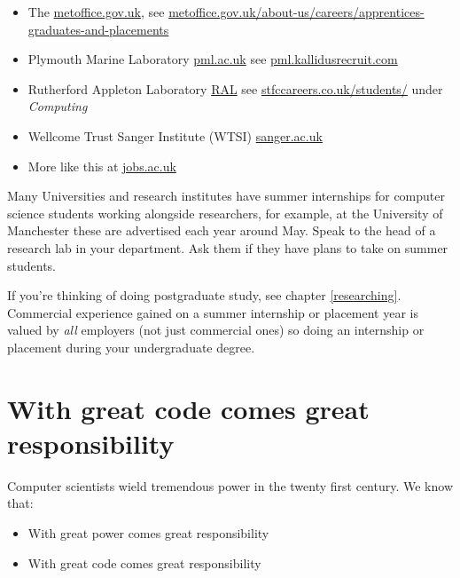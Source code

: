 \documentclass[
]{book}
\providecommand{\tightlist}{%
  \setlength{\itemsep}{0pt}\setlength{\parskip}{0pt}}
\begin{document}
\begin{itemize}
\item
  The \href{https://www.metoffice.gov.uk/}{metoffice.gov.uk}, see \href{https://www.metoffice.gov.uk/about-us/careers/apprentices-graduates-and-placements}{metoffice.gov.uk/about-us/careers/apprentices-graduates-and-placements}
\item
  Plymouth Marine Laboratory \href{https://www.pml.ac.uk/}{pml.ac.uk} see \href{https://pml.kallidusrecruit.com/}{pml.kallidusrecruit.com}
\item
  Rutherford Appleton Laboratory \href{https://en.wikipedia.org/wiki/Rutherford_Appleton_Laboratory}{RAL} see \href{https://stfccareers.co.uk/students/}{stfccareers.co.uk/students/} under \emph{Computing}
\item
  Wellcome Trust Sanger Institute (WTSI) \href{https://www.sanger.ac.uk/}{sanger.ac.uk}
\item
  More like this at \href{https://jobs.ac.uk/}{jobs.ac.uk}
\end{itemize}

Many Universities and research institutes have summer internships for computer science students working alongside researchers, for example, at the University of Manchester these are advertised each year around May. Speak to the head of a research lab in your department. Ask them if they have plans to take on summer students.

If you're thinking of doing postgraduate study, see chapter \ref{researching}. Commercial experience gained on a summer internship or placement year is valued by \emph{all} employers (not just commercial ones) so doing an internship or placement during your undergraduate degree.

\hypertarget{peterparker}{%
\section{With great code comes great responsibility}\label{peterparker}}

Computer scientists wield tremendous power in the twenty first century. We know that:

\begin{itemize}
\tightlist
\item
  With great power comes great responsibility \citep{spiderman}
\item
  With great code comes great responsibility \citep{responsiblecs}
\end{itemize}
\end{document}
